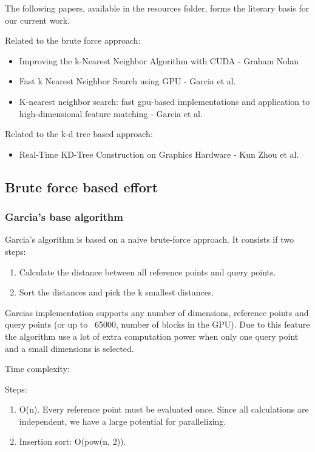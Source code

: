 The following papers, available in the resources folder, forms the literary basis for our current work.

Related to the brute force approach:
\begin{itemize}
    \item Improving the k-Nearest Neighbor Algorithm with CUDA - Graham Nolan
    \item Fast k Nearest Neighbor Search using GPU - Garcia et al.
    \item K-nearest neighbor search: fast gpu-based implementations and application to high-dimensional feature matching - Garcia et al.
\end{itemize}

Related to the k-d tree based approach:
\begin{itemize}
    \item Real-Time KD-Tree Construction on Graphics Hardware - Kun Zhou et al.
\end{itemize}


\subsection{Brute force based effort} %
\label{sub:brute_force_based_effort}

\subsubsection{Garcia's base algorithm} %
\label{ssub:garcias_base_algorithme}

Garcia's algorithm is based on a naive brute-force approach. It consists if two steps:
\begin{enumerate}
    \item Calculate the distance between all reference points and query points.
    \item Sort the distances and pick the k smallest distances.
\end{enumerate}

Garcias implementation supports any number of dimensions, reference points and query points (or up to ~65000, number of blocks in the GPU). Due to this feature the algorithm use a lot of extra computation power when only one query point and a small dimensions is selected.

Time complexity:

Steps:

\begin{enumerate}
    \item O(n). Every reference point must be evaluated once. Since all calculations are independent, we have a large potential for parallelizing.
    \item Insertion sort: O(pow(n, 2)).
\end{enumerate}


